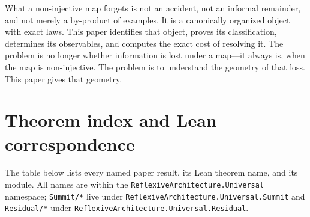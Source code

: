 \documentclass[11pt,a4paper]{article}
\theoremstyle{plain}
\theoremstyle{definition}
\theoremstyle{remark}
\begin{document}
What a non-injective map forgets is not an accident, not an informal remainder,
and not merely a by-product of examples. It is a canonically organized object
with exact laws. This paper identifies that object, proves its classification,
determines its observables, and computes the exact cost of resolving it. The
problem is no longer whether information is lost under a map---it always is,
when the map is non-injective. The problem is to understand the geometry of
that loss. This paper gives that geometry.

\appendix
\section{Theorem index and Lean correspondence}\label{app:index}

{\sloppy The table below lists every named paper result, its Lean theorem name, and
its module. All names are within the \texttt{ReflexiveArchitecture\allowbreak.Universal}
namespace; \texttt{Summit/*} live under
\texttt{ReflexiveArchitecture\allowbreak.Universal\allowbreak.Summit} and
\texttt{Residual/*} under
\texttt{ReflexiveArchitecture\allowbreak.Universal\allowbreak.Residual}.}
\end{document}
